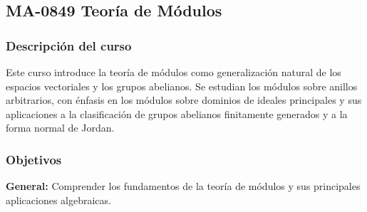 \newpage
\subsection*{MA-0849 Teoría de Módulos}

\hypertarget{MA0849}{}
\begin{refsection}
\begin{table}[H]
\end{table}

\subsubsection*{Descripción del curso}
Este curso introduce la teoría de módulos como generalización natural de los espacios vectoriales y los grupos abelianos. Se estudian los módulos sobre anillos arbitrarios, con énfasis en los módulos sobre dominios de ideales principales y sus aplicaciones a la clasificación de grupos abelianos finitamente generados y a la forma normal de Jordan. %




\subsubsection*{Objetivos}

\textbf{General:} Comprender los fundamentos de la teoría de módulos y sus principales aplicaciones algebraicas.


\end{refsection}

